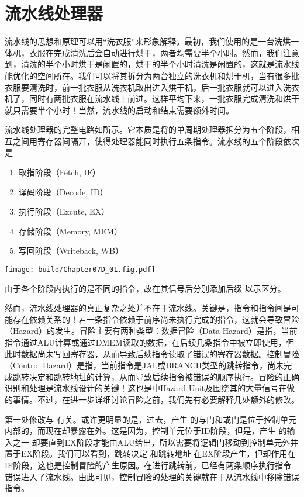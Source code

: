 \section{流水线处理器}

流水线的思想和原理可以用“洗衣服”来形象解释。最初，我们使用的是一台洗烘一体机，衣服在完成清洗后会自动进行烘干，两者均需要半个小时。然而，我们注意到，清洗的半个小时烘干是闲置的，烘干的半个小时清洗是闲置的，这就是流水线能优化的空间所在。我们可以将其拆分为两台独立的洗衣机和烘干机，当有很多批衣服要清洗时，前一批衣服从洗衣机取出进入烘干机，后一批衣服就可以进入洗衣机了，同时有两批衣服在流水线上前进。这样平均下来，一批衣服完成清洗和烘干就只需要半个小时！当然，流水线的启动和结束需要额外时间。

流水线处理器的完整电路如所示。它本质是将的单周期处理器拆分为五个阶段，相互之间用寄存器间隔开，使得处理器能同时执行五条指令。流水线的五个阶段依次是
\begin{enumerate}
    \item 取指阶段（Fetch, IF）
    \item 译码阶段（Decode, ID）
    \item 执行阶段（Excute, EX）
    \item 存储阶段（Memory, MEM）
    \item 写回阶段（Writeback, WB）
\end{enumerate}
\begin{Figure}
    \texttt{[image: build/Chapter07D\_01.fig.pdf]}
\end{Figure}

由于各个阶段内执行的是不同的指令，故在其信号后分别添加后缀 以示区分。

然而，流水线处理器的真正复杂之处并不在于流水线。关键是，指令和指令间是可能存在依赖关系的！若一条指令依赖于前序尚未执行完成的指令，这就会导致冒险（Hazard）的发生。冒险主要有两种类型：数据冒险（Data Hazard）是指，当前指令通过ALU计算或通过DMEM读取的数据，在后续几条指令中被立即使用，但此时数据尚未写回寄存器，从而导致后续指令读取了错误的寄存器数据。控制冒险（Control Hazard）是指，当前指令是JAL或BRANCH类型的跳转指令，尚未完成跳转决定和跳转地址的计算，从而导致后续指令被错误的顺序执行。冒险的正确识别和处理是流水线设计的关键！这也是中Hazard Unit及围绕其的大量信号在做的事情。不过，在进一步详细讨论冒险之前，我们先有必要解释几处额外的修改。

第一处修改与 有关。或许更明显的是，过去，产生 的与门和或门是位于控制单元内部的，而现在却暴露在外。这是因为，控制单元位于ID阶段，但是，产生 的输入之一 却要直到EX阶段才能由ALU给出，所以需要将逻辑门移动到控制单元外并置于EX阶段。我们可以看到，跳转决定 和跳转地址 在EX阶段产生，但却作用在IF阶段，这也是控制冒险的产生原因。在进行跳转前，已经有两条顺序执行指令错误进入了流水线。由此可见，控制冒险的处理的关键就在于从流水线中移除错误指令。

